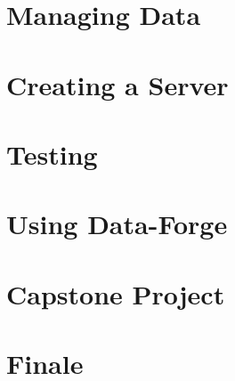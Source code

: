\documentclass{article}
\begin{document}
\section{Managing Data}

\section{Creating a Server}

\section{Testing}

\section{Using Data-Forge}

\section{Capstone Project}

\section{Finale}
\end{document}
